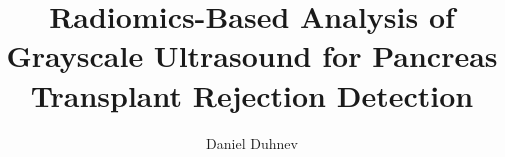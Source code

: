 \documentclass[a4paper,12pt,twoside]{report}
\begin{document}


\title{Radiomics-Based Analysis of Grayscale Ultrasound for Pancreas Transplant Rejection Detection}
\author{Daniel Duhnev}
\tutor{}

\maketitle

    \restoregeometry

    \preface
    \cleardoublepage 


    
    
    
    
    \body
    
    
    
    
    
    
    \listoffigures
    \newpage
    \listoftables
    
    
    
    
    
\end{document}
